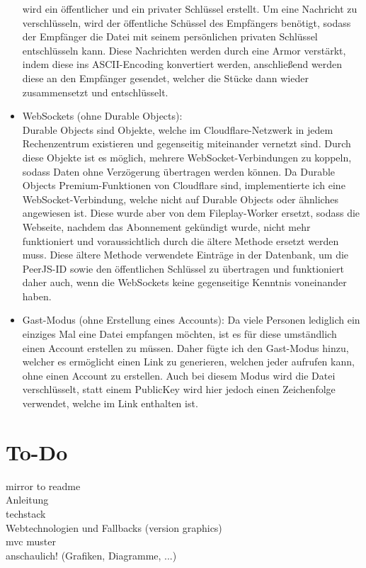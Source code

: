 \documentclass[a4paper]{article}
\begin{document}
\begin{itemize}
        wird ein öffentlicher und ein privater Schlüssel erstellt. Um eine Nachricht zu
        verschlüsseln, wird der öffentliche Schüssel des Empfängers benötigt, sodass der
        Empfänger die Datei mit seinem persönlichen privaten Schlüssel entschlüsseln kann.
        Diese Nachrichten werden durch eine Armor verstärkt, indem diese ins ASCII-Encoding
        konvertiert werden, anschließend werden diese an den Empfänger gesendet, welcher
        die Stücke dann wieder zusammensetzt und entschlüsselt.
  \item WebSockets (ohne Durable Objects):\\
        Durable Objects sind Objekte,
        welche im Cloudflare-Netzwerk in jedem Rechenzentrum existieren und gegenseitig miteinander
        vernetzt sind. Durch diese Objekte ist es möglich, mehrere WebSocket-Verbindungen zu koppeln,
        sodass Daten ohne Verzögerung übertragen werden können. Da Durable Objects Premium-Funktionen
        von Cloudflare sind, implementierte ich eine WebSocket-Verbindung, welche nicht auf Durable Objects
        oder ähnliches angewiesen ist. Diese wurde aber von dem Fileplay-Worker ersetzt, sodass
        die Webseite, nachdem das Abonnement gekündigt wurde, nicht mehr funktioniert und
        voraussichtlich durch die ältere Methode ersetzt werden muss. Diese ältere Methode verwendete
        Einträge in der Datenbank, um die PeerJS-ID sowie den öffentlichen Schlüssel zu übertragen und funktioniert
        daher auch, wenn die WebSockets keine gegenseitige Kenntnis voneinander haben.
  \item Gast-Modus (ohne Erstellung eines Accounts):
        Da viele Personen lediglich ein einziges Mal eine Datei empfangen möchten, ist es für diese umständlich
        einen Account erstellen zu müssen. Daher fügte ich den Gast-Modus hinzu, welcher es ermöglicht
        einen Link zu generieren, welchen jeder aufrufen kann, ohne einen Account zu erstellen. Auch bei diesem
        Modus wird die Datei verschlüsselt, statt einem PublicKey wird hier jedoch einen Zeichenfolge verwendet, welche
        im Link enthalten ist.
\end{itemize}

\section{To-Do}
mirror to readme\\
Anleitung\\
techstack\\
Webtechnologien und Fallbacks (version graphics)\\
mvc muster\\
anschaulich! (Grafiken, Diagramme, ...)
\end{document}

